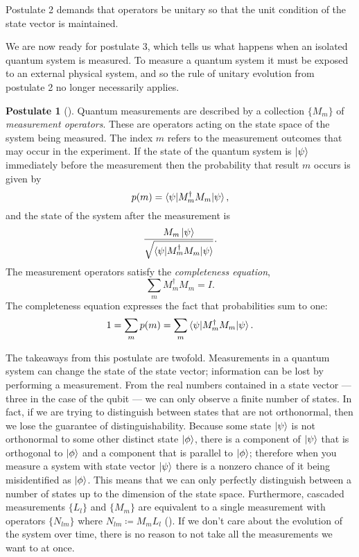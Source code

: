 \documentclass[12pt,twoside]{reedthesis}
\theoremstyle{plain}   %
\theoremstyle{definition}
\newtheorem{post}{Postulate}[section]
\theoremstyle{remark}
\numberwithin{equation}{section}
\begin{document}
  Postulate 2 demands that operators be unitary so that the unit condition of the state vector is maintained. \par
  We are now ready for postulate 3, which tells us what happens when an isolated quantum system is measured.
  To measure a quantum system it must be exposed to an external physical system, and so the rule of unitary evolution from postulate 2 no longer necessarily applies.
  \begin{post}[{\cite[2.2.3]{nielsen2010}}]
    Quantum measurements are described by a collection $\{M_m\}$ of \emph{measurement operators}.
    These are operators acting on the state space of the system being measured.
    The index $m$ refers to the measurement outcomes that may occur in the experiment.
    If the state of the quantum system is $\ket{\psi}$ immediately before the measurement then the probability that result $m$ occurs is given by
    \[ p(m) = \braket{ \psi | M_m^\dag M_m | \psi},\]
    and the state of the system after the measurement is
    \[ \dfrac{M_m \ket{\psi}}{\sqrt{\braket{\psi | M_m^\dag M_m | \psi}}}.\]
    The measurement operators satisfy the \emph{completeness equation},
    \[ \sum_m M_m^\dag M_m = I.\]
    The completeness equation expresses the fact that probabilities sum to one:
    \[ 1 = \sum_m p(m) = \sum_m \braket{\psi | M_m^\dag M_m | \psi}.\]
  \end{post}
  The takeaways from this postulate are twofold. Measurements in a quantum system can change the state of the state vector; information can be lost by performing a measurement.
  From the real numbers contained in a state vector --- three in the case of the qubit --- we can only observe a finite number of states.
  In fact, if we are trying to distinguish between states that are not orthonormal, then we lose the guarantee of distinguishability.
  Because some state $\ket{\psi}$ is not orthonormal to some other distinct state $\ket{\phi}$, there is a component of $\ket{\psi}$ that is orthogonal to $\ket{\phi}$ and a component
  that is parallel to $\ket{\phi}$; therefore when you measure a system with state vector $\ket{\psi}$ there is a nonzero chance of it being misidentified as $\ket{\phi}$.
  This means that we can only perfectly distinguish between a number of states up to the dimension of the state space.
  Furthermore, cascaded measurements $\{L_l \}$ and $\{M_m\}$ are equivalent to a single measurement with operators $\{N_{lm}\}$ where $N_{lm} \coloneq M_m L_l$ (\cite[2.57]{nielsen2010}).
  If we don't care about the evolution of the system over time, there is no reason to not take all the measurements we want to at once. \par
\end{document}
